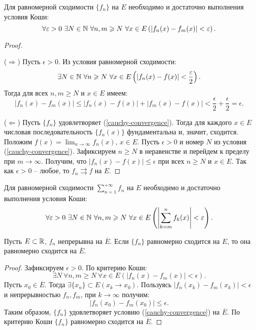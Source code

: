 
\begin{theorem}
    Для равномерной сходимости $\{f_{n}\}$ на $E$ необходимо и достаточно выполнения условия Коши:
    \label{cauchy-convergence}
    \[\forall \epsilon > 0 \ \exists N \in \N \ \forall n, m \geq N \ \forall x \in E \left(\left|f_{n}(x) - f_{m}(x)\right| < \epsilon\right).\]
\end{theorem}

\begin{proof}~

    ($\Rightarrow$) Пусть $\epsilon > 0$. Из условия равномерной сходимости:
    \[\exists N \in \mathbb{N} \ \forall n \geqslant N \ \forall x \in E \left(\left|f_{n}(x) - f(x)\right| < \frac{\varepsilon}{2}\right).\]
    Тогда для всех $n, m \geq N$ и $x \in E$ имеем:
    \[\left|f_{n}(x) - f_{m}(x)\right| \leq |f_{n}(x) - f(x)| + |f_{m}(x) - f(x)| < \frac{\epsilon}{2} + \frac{\epsilon}{2} = \epsilon.\]
    
    ($\Leftarrow$) Пусть $\{f_{n}\}$ удовлетворяет (\ref{cauchy-convergence}). Тогда для каждого $x \in E$ числовая последовательность $\{f_{n}(x)\}$ фундаментальна и, значит, сходится. Положим $f(x) = \lim_{n \to \infty} f_{n}(x)$, $x \in E$. Пусть $\epsilon > 0$ и номер $N$ из условия (\ref{cauchy-convergence}). Зафиксируем $n \geq N$ в неравенстве и перейдем к пределу при $m \to \infty$. Получим, что $|f_{n}(x) - f(x)| \leq \epsilon$ при всех $n \geq N$ и $x \in E$. Так как $\epsilon > 0$ -- любое, то $f_{n} \rightrightarrows f$ на $E$.
\end{proof}

\begin{corollary}
    Для равномерной сходимости $\sum_{n = 1}^{+\infty}f_{n}$ на $E$ необходимо и достаточно выполнения условия Коши:
    \[\forall \epsilon > 0 \ \exists N \in \N \ \forall n, m \geq N \ \forall x \in E \left(\left|\sum_{k = m}^{n}f_{k}(x)\right| < \epsilon\right).\]
\end{corollary}

\begin{corollary}
    Пусть $E \subset \mathbb{R}$, $f_{n}$ непрерывна на $\overline{E}$. Если $\{f_{n}\}$ равномерно сходится на $E$, то она равномерно сходится на $\overline{E}$.
\end{corollary}

\begin{proof}
    Зафиксируем $\epsilon > 0$. По критерию Коши:
    \[\exists N \ \forall n, m \geq N \ \forall x \in E \left(|f_{n}(x) - f_{m}(x)| < \epsilon\right).\]
    Пусть $x_{0} \in \overline{E}$. Тогда $\exists \{x_{n}\} \subset E (x_{k} \to x_{0})$.
    Пользуясь $|f_{n}(x_{k}) - f_{m}(x_{k})| < \epsilon$ и непрерывностью $f_{n}, f_{m}$, при $k \rightarrow \infty$ получим:
    \[|f_{n}(x_{0}) - f_{m}(x_{0})| \leq \epsilon.\]
    Таким образом, $\{f_{n}\}$ удовлетворяет условию (\ref{cauchy-convergence}) на $\overline{E}$. По критерию Коши $\{f_{n}\}$ равномерно сходится на $\overline{E}$.
\end{proof}

